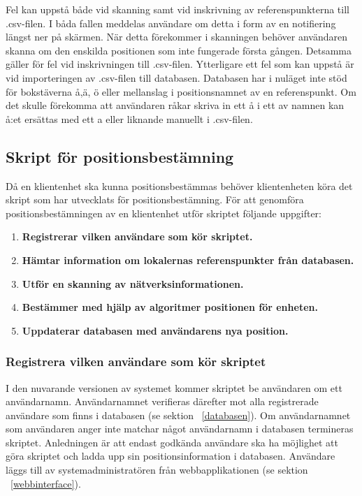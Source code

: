 \documentclass[a4paper,12pt]{article}
\begin{document}
 Fel kan uppstå både vid skanning samt vid inskrivning av referenspunkterna till .csv-filen. I båda fallen meddelas användare om detta i form av en notifiering längst ner på skärmen. När detta förekommer i skanningen behöver användaren skanna om den enskilda positionen som inte fungerade första gången. Detsamma gäller för fel vid inskrivningen till .csv-filen.
 Ytterligare ett fel som kan uppstå är vid importeringen av .csv-filen till databasen. Databasen har i nuläget inte stöd för bokstäverna å,ä, ö eller mellanslag i positionsnamnet av en referenspunkt. Om det skulle förekomma att användaren råkar skriva in ett å i ett av namnen kan å:et ersättas med ett a eller liknande manuellt i .csv-filen.

 \subsection{Skript för positionsbestämning}
 Då en klientenhet ska kunna positionsbestämmas behöver klientenheten köra det skript som har utvecklats för positionsbestämning. För att genomföra positionsbestämningen av en klientenhet utför skriptet följande uppgifter:
 \begin{enumerate}
   \item \textbf{Registrerar vilken användare som kör skriptet.}
   \item \textbf{Hämtar information om lokalernas referenspunkter från databasen.}
   \item \textbf{Utför en skanning av nätverksinformationen.}
   \item \textbf{Bestämmer med hjälp av algoritmer positionen för enheten.}
   \item \textbf{Uppdaterar databasen med användarens nya position.}
 \end{enumerate}


 \subsubsection{Registrera vilken användare som kör skriptet}
 I den nuvarande versionen av systemet kommer skriptet be användaren om ett användarnamn. Användarnamnet verifieras därefter mot alla registrerade användare som finns i databasen (se sektion ~\ref{databasen}). Om användarnamnet som användaren anger inte matchar något användarnamn i databasen termineras skriptet. Anledningen är att endast godkända användare ska ha möjlighet att göra skriptet och ladda upp sin positionsinformation i databasen. Användare läggs till av systemadministratören från webbapplikationen (se sektion ~\ref{webbinterface}).
\end{document}
